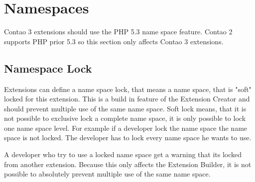 \section[sec:namespaces]{Namespaces}

Contao 3 extensions should use the PHP 5.3 name space feature. Contao 2 supports PHP prior 5.3 so this section only affects Contao 3 extensions.

\subsection[sec:namespace lock]{Namespace Lock}
Extensions can define a name space lock, that means a name space, that is "soft" locked for this extension.
This is a build in feature of the Extension Creator and should prevent multiple use of the same name space.
Soft lock means, that it is not possible to exclusive lock a complete name space, it is only possible to lock one name space level.
For example if a developer lock the name space  the name space  is not locked.
The developer has to lock every name space he wants to use.

A developer who try to use a locked name space get a warning that its locked from another extension.
Because this only affects the Extension Builder, it is not possible to absolutely prevent multiple use of the same name space.
